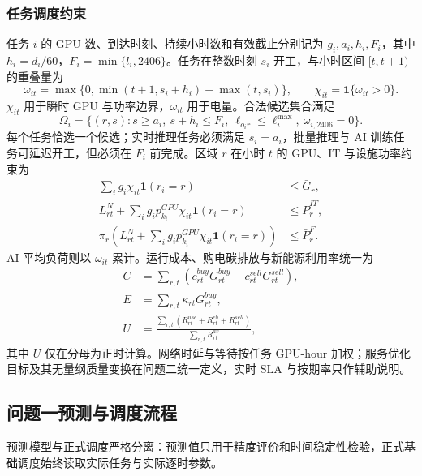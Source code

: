 \subsubsection{任务调度约束}
任务 $i$ 的 GPU 数、到达时刻、持续小时数和有效截止分别记为 $g_i,a_i,h_i,F_i$，其中 $h_i=d_i/60$，$F_i=\min\{l_i,2406\}$。任务在整数时刻 $s_i$ 开工，与小时区间 $[t,t+1)$ 的重叠量为
\begin{equation}
\omega_{it}=\max\{0,\min(t+1,s_i+h_i)-\max(t,s_i)\},\qquad
\chi_{it}=\mathbf 1\{\omega_{it}>0\}.
\end{equation}
$\chi_{it}$ 用于瞬时 GPU 与功率边界，$\omega_{it}$ 用于电量。合法候选集合满足
\begin{equation}
\Omega_i=\{(r,s):s\ge a_i,\ s+h_i\le F_i,\ \ell_{o_i r}\le \ell_i^{\max},\ \omega_{i,2406}=0\}.
\end{equation}
每个任务恰选一个候选；实时推理任务必须满足 $s_i=a_i$，批量推理与 AI 训练任务可延迟开工，但必须在 $F_i$ 前完成。区域 $r$ 在小时 $t$ 的 GPU、IT 与设施功率约束为
\begin{align}
\sum_i g_i\chi_{it}\mathbf 1(r_i=r)&\le \bar G_r,\\
L_{rt}^{N}+\sum_i g_i p_{k_i}^{GPU}\chi_{it}\mathbf 1(r_i=r)&\le \bar P_r^{IT},\\
\pi_r\!\left(L_{rt}^{N}+\sum_i g_i p_{k_i}^{GPU}\chi_{it}\mathbf 1(r_i=r)\right)&\le \bar P_r^{F}.
\end{align}
AI 平均负荷则以 $\omega_{it}$ 累计。运行成本、购电碳排放与新能源利用率统一为
\begin{align}
C&=\sum_{r,t}(c^{buy}_{rt}G^{buy}_{rt}-c^{sell}_{rt}G^{sell}_{rt}),\\
E&=\sum_{r,t}\kappa_{rt}G^{buy}_{rt},\\
U&=\frac{\sum_{r,t}(R^{use}_{rt}+R^{ch}_{rt}+R^{sell}_{rt})}{\sum_{r,t}R^{av}_{rt}},
\end{align}
其中 $U$ 仅在分母为正时计算。网络时延与等待按任务 GPU-hour 加权；服务优化目标及其无量纲质量变换在问题二统一定义，实时 SLA 与按期率只作辅助说明。

\subsection{问题一预测与调度流程}
预测模型与正式调度严格分离：预测值只用于精度评价和时间稳定性检验，正式基础调度始终读取实际任务与实际逐时参数。


